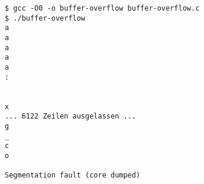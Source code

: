 \begin{lstlisting}[caption={Schreiben Arraygrenzen hinaus, lesen bis Segmentation fault},label=buffer-overflow.term]
$ gcc -O0 -o buffer-overflow buffer-overflow.c
$ ./buffer-overflow
a
a
a
a
a
:
 
 
x
... 6122 Zeilen ausgelassen ...
g
_
c
o

Segmentation fault (core dumped)
\end{lstlisting}

